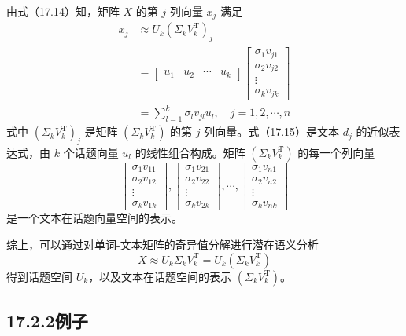 \documentclass[UTF8, 12pt, fontset=fandol, oneside]{ctexart}
\begin{document}
由式（17.14）知，矩阵 $X$ 的第 $j$ 列向量 $x_j$ 满足
\begin{equation}
\begin{aligned}
x_j&\approx U_k(\Sigma_kV_k^{\mathrm{T}})_j\\
&=
\begin{bmatrix}
u_1 & u_2 & \cdots & u_k
\end{bmatrix}
\begin{bmatrix}
\sigma_1 v_{j1}\\
\sigma_2 v_{j2}\\
\vdots\\
\sigma_k v_{jk}
\end{bmatrix}\\
&=\sum_{l=1}^k \sigma_l v_{jl}u_l,\quad j=1,2,\cdots,n
\end{aligned}
\tag{17.15}
\end{equation}
式中 $(\Sigma_kV_k^{\mathrm{T}})_j$ 是矩阵 $(\Sigma_kV_k^{\mathrm{T}})$ 的第 $j$ 列向量。式（17.15）是文本 $d_j$ 的近似表达式，由 $k$ 个话题向量 $u_l$ 的线性组合构成。矩阵 $(\Sigma_kV_k^{\mathrm{T}})$ 的每一个列向量
\[
\begin{bmatrix}
\sigma_1v_{11}\\
\sigma_2v_{12}\\
\vdots\\
\sigma_kv_{1k}
\end{bmatrix},
\begin{bmatrix}
\sigma_1v_{21}\\
\sigma_2v_{22}\\
\vdots\\
\sigma_kv_{2k}
\end{bmatrix},
\cdots,
\begin{bmatrix}
\sigma_1v_{n1}\\
\sigma_2v_{n2}\\
\vdots\\
\sigma_kv_{nk}
\end{bmatrix}
\]
是一个文本在话题向量空间的表示。

综上，可以通过对单词-文本矩阵的奇异值分解进行潜在语义分析
\begin{equation}
X\approx U_k\Sigma_kV_k^{\mathrm{T}}=U_k(\Sigma_kV_k^{\mathrm{T}})
\tag{17.16}
\end{equation}
得到话题空间 $U_k$，以及文本在话题空间的表示 $(\Sigma_kV_k^{\mathrm{T}})$。

\subsection*{17.2.2\quad 例子}
\end{document}
